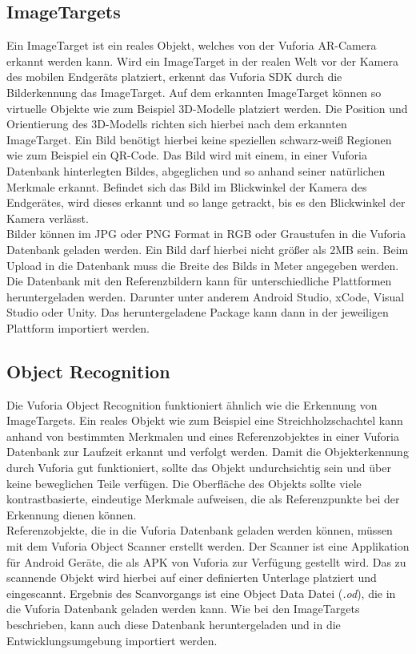 \subsection{ImageTargets}
\label{sec:fund_imagetargets}
Ein ImageTarget ist ein reales Objekt, welches von der Vuforia AR-Camera erkannt werden kann. Wird ein ImageTarget in der realen Welt vor der Kamera des mobilen Endgeräts platziert, erkennt das Vuforia SDK durch die Bilderkennung das ImageTarget. Auf dem erkannten ImageTarget können so virtuelle Objekte wie zum Beispiel 3D-Modelle platziert werden. Die Position und Orientierung des 3D-Modells richten sich hierbei nach dem erkannten ImageTarget.
Ein Bild benötigt hierbei keine speziellen schwarz-weiß Regionen wie zum Beispiel ein QR-Code. Das Bild wird mit einem, in einer Vuforia Datenbank hinterlegten Bildes, abgeglichen und so anhand seiner natürlichen Merkmale erkannt. Befindet sich das Bild im Blickwinkel der Kamera des Endgerätes, wird dieses erkannt und so lange getrackt, bis es den Blickwinkel der Kamera verlässt.\\
Bilder können im JPG oder PNG Format in RGB oder Graustufen in die Vuforia Datenbank geladen werden. Ein Bild darf hierbei nicht größer als 2MB sein. Beim Upload in die Datenbank muss die Breite des Bilds in Meter angegeben werden. Die Datenbank mit den Referenzbildern kann für unterschiedliche Plattformen heruntergeladen werden. Darunter unter anderem Android Studio, xCode, Visual Studio oder Unity. Das heruntergeladene Package kann dann in der jeweiligen Plattform importiert werden.\cite{VuforiaArticle} \cite{VuforiaImageTargetGuide}

\subsection{Object Recognition}
Die Vuforia Object Recognition funktioniert ähnlich wie die Erkennung von ImageTargets. Ein reales Objekt wie zum Beispiel eine Streichholzschachtel kann anhand von bestimmten Merkmalen und eines Referenzobjektes in einer Vuforia Datenbank zur Laufzeit erkannt und verfolgt werden. Damit die Objekterkennung durch Vuforia gut funktioniert, sollte das Objekt undurchsichtig sein und über keine beweglichen Teile verfügen. Die Oberfläche des Objekts sollte viele kontrastbasierte, eindeutige Merkmale aufweisen, die als Referenzpunkte bei der Erkennung dienen können.\\
Referenzobjekte, die in die Vuforia Datenbank geladen werden können, müssen mit dem Vuforia Object Scanner \cite{VuforiaScanner} erstellt werden. Der Scanner ist eine Applikation für Android Geräte, die als APK von Vuforia zur Verfügung gestellt wird. Das zu scannende Objekt wird hierbei auf einer definierten Unterlage platziert und eingescannt. Ergebnis des Scanvorgangs ist eine Object Data Datei (\textit{.od}), die in die Vuforia Datenbank geladen werden kann. Wie bei den ImageTargets beschrieben, kann auch diese Datenbank heruntergeladen und in die Entwicklungsumgebung importiert werden.

